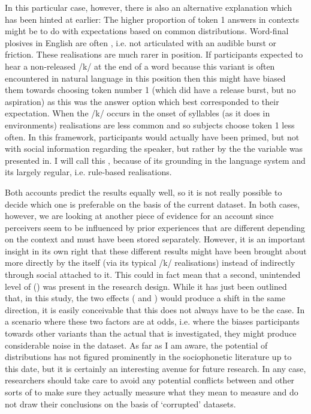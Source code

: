 In this particular case, however, there is also an alternative explanation which has been hinted at earlier: The higher proportion of token 1 answers in  contexts might be to do with expectations based on common  distributions.
Word-final plosives in English are often , i.e. not articulated with an audible burst or friction.
These  realisations are much rarer in  position.
If participants expected to hear a non-released /k/ at the end of a word because this variant is often encountered in natural language in this position then this might have biased them towards choosing token number 1 (which did have a release burst, but no aspiration) as this was the answer option which best corresponded to their expectation.
When the /k/ occurs in the onset of syllables (as it does in  environments)  realisations are less common and so subjects choose token 1 less often.
In this framework, participants would actually have been primed, but not with social information regarding the speaker, but rather by the  the variable was presented in.
I will call this  , because of its grounding in the language system and its largely regular, i.e. rule-based realisations.

Both accounts predict the results equally well, so it is not really possible to decide which one is preferable on the basis of the current dataset.
In both cases, however, we are looking at another piece of evidence for an  account since perceivers seem to be influenced by prior experiences that are different depending on the context and must have been stored separately.
However, it is an important insight in its own right that these different results might have been brought about more directly by the  itself (via its typical  /k/ realisations) instead of indirectly through social  attached to it.
This could in fact mean that a second, unintended level of ()  was present in the research design.
While it has just been outlined that, in this study, the two effects ( and  ) would produce a shift in the same direction, it is easily conceivable that this does not always have to be the case.
In a scenario where these two factors are at odds, i.e. where the  biases participants towards other variants than the actual  that is investigated, they might produce considerable noise in the dataset.
As far as I am aware, the  potential of  distributions has not figured prominently in the sociophonetic literature up to this date, but it is certainly an interesting avenue for future research.
In any case, researchers should take care to avoid any potential conflicts between  and other sorts of  to make sure they actually measure what they mean to measure and do not draw their conclusions on the basis of `corrupted' datasets.


